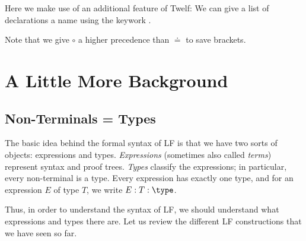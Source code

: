 Here we make use of an additional feature of Twelf: We can give a list of declarations a name using the keywork .

Note that we give $\circ$ a higher precedence than $\doteq$ to save brackets.

\section{A Little More Background}\label{sec:lffe:types}

\subsection{Non-Terminals = Types}

The basic idea behind the formal syntax of LF is that we have two sorts of objects: expressions and types. \emph{Expressions} (sometimes also called \emph{terms}) represent syntax and proof trees. \emph{Types} classify the expressions; in particular, every non-terminal is a type. Every expression has exactly one type, and for an expression $E$ of type $T$, we write $E:T:\type$.

Thus, in order to understand the syntax of LF, we should understand what expressions and types there are. Let us review the different LF constructions that we have seen so far.

